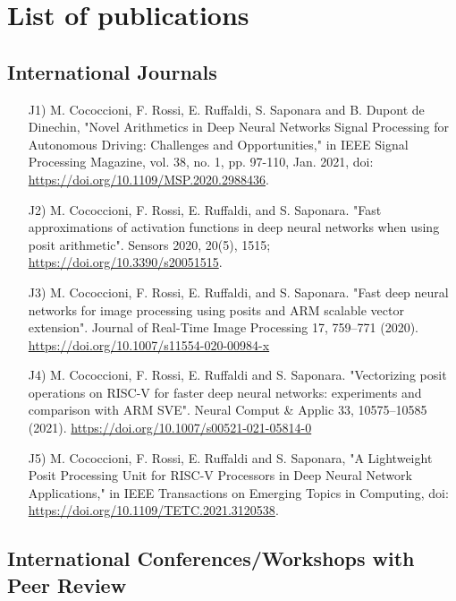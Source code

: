 \chapter*{List of publications}

\section*{International Journals}
\begin{enumerate}
    \item[J1)] M. Cococcioni, F. Rossi, E. Ruffaldi, S. Saponara and B. Dupont de Dinechin, "Novel Arithmetics in Deep Neural Networks Signal Processing for Autonomous Driving: Challenges and Opportunities," in IEEE Signal Processing Magazine, vol. 38, no. 1, pp. 97-110, Jan. 2021, doi: \url{https://doi.org/10.1109/MSP.2020.2988436}.
    \item[J2)] M. Cococcioni, F. Rossi, E. Ruffaldi, and S. Saponara. "Fast approximations of activation functions in deep neural networks when using posit arithmetic". Sensors 2020, 20(5), 1515; \url{https://doi.org/10.3390/s20051515}.
    \item[J3)] M. Cococcioni, F. Rossi, E. Ruffaldi, and S. Saponara. "Fast deep neural networks for image processing using posits and ARM scalable vector extension". Journal of Real-Time Image Processing 17, 759–771 (2020). \url{https://doi.org/10.1007/s11554-020-00984-x}
    \item[J4)] M. Cococcioni, F. Rossi, E. Ruffaldi and S. Saponara. "Vectorizing posit operations on RISC-V for faster deep neural networks: experiments and comparison with ARM SVE". Neural Comput \& Applic 33, 10575–10585 (2021). \url{https://doi.org/10.1007/s00521-021-05814-0}
    \item[J5)] M. Cococcioni, F. Rossi, E. Ruffaldi and S. Saponara, "A Lightweight Posit Processing Unit for RISC-V Processors in Deep Neural Network Applications," in IEEE Transactions on Emerging Topics in Computing, doi: \url{https://doi.org/10.1109/TETC.2021.3120538}.
  

\end{enumerate}
\section*{International Conferences/Workshops with Peer Review}

